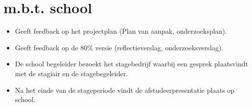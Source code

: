\section{m.b.t. school}
\begin{itemize}
\item Geeft feedback op het projectplan (Plan van aanpak, onderzoeksplan).
\item Geeft feedback op de 80\% versie (reflectieverslag, onderzoeksverslag).
\item De school begeleider bezoekt het stagebedrijf waarbij een gesprek plaatsvindt met de stagiair en de stagebegeleider.
\item Na het einde van de stageperiode vindt de afstudeerpresentatie plaats op school.
\end{itemize}